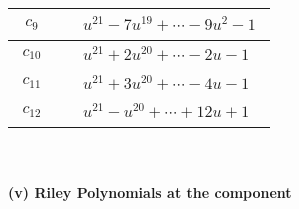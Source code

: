 \documentclass[1p]{elsarticle_modified}
\theoremstyle{definition}
\begin{document}
\begin{tabular}{m{50pt}|m{274pt}}
\hline $$\begin{aligned}c_{9}\end{aligned}$$&$\begin{aligned}
&u^{21}-7 u^{19}+\cdots-9 u^2-1
\end{aligned}$\\
\hline $$\begin{aligned}c_{10}\end{aligned}$$&$\begin{aligned}
&u^{21}+2 u^{20}+\cdots-2 u-1
\end{aligned}$\\
\hline $$\begin{aligned}c_{11}\end{aligned}$$&$\begin{aligned}
&u^{21}+3 u^{20}+\cdots-4 u-1
\end{aligned}$\\
\hline $$\begin{aligned}c_{12}\end{aligned}$$&$\begin{aligned}
&u^{21}- u^{20}+\cdots+12 u+1
\end{aligned}$\\
\hline
\end{tabular}\\~\\
\newpage\renewcommand{\arraystretch}{1}
\flushleft \textbf{(v) Riley Polynomials at the component}\newline \\
\end{document}
